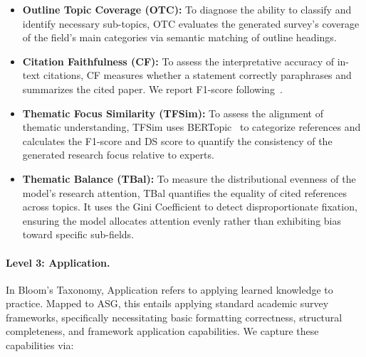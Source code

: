 \documentclass[11pt]{article}
\begin{document}
\begin{itemize}[leftmargin=0.2cm, itemsep=0pt, parsep=0pt]
    \item \textbf{Outline Topic Coverage (OTC):} To diagnose the ability to classify and identify necessary sub-topics, OTC evaluates the generated survey's coverage of the field's main categories via semantic matching of outline headings.

    \item \textbf{Citation Faithfulness (CF):} To assess the interpretative accuracy of in-text citations, CF measures whether a statement correctly paraphrases and summarizes the cited paper. We report F1-score following~\cite{wang2024autosurvey}.

    \item \textbf{Thematic Focus Similarity (TFSim):} To assess the alignment of thematic understanding, TFSim uses BERTopic~\citep{grootendorst2022bertopic} to categorize references and calculates the F1-score and DS score to quantify the consistency of the generated research focus relative to experts.

    \item \textbf{Thematic Balance (TBal):} To measure the distributional evenness of the model's research attention, TBal quantifies the equality of cited references across topics. It uses the Gini Coefficient \cite{gini1912variabilita} to detect disproportionate fixation, ensuring the model allocates attention evenly rather than exhibiting bias toward specific sub-fields.
\end{itemize}

\paragraph{Level 3: Application.}
\label{sec:l3_application}
In Bloom's Taxonomy, Application refers to applying learned knowledge to practice. Mapped to ASG, this entails applying standard academic survey frameworks, specifically necessitating basic formatting correctness, structural completeness, and framework application capabilities. We capture these capabilities via:
\end{document}
